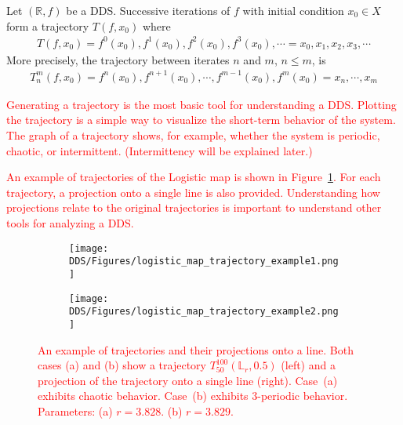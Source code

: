 \begin{definition}[Trajectory]
    Let $\left( \mathbb{R}, f \right)$ be a DDS. Successive iterations of $f$ with initial condition $x_0 \in X$ form a trajectory $T(f, x_0)$ where \begin{eqnarray}
        T(f, x_0) = f^0(x_0), f^1(x_0), f^2(x_0), f^3(x_0), \cdots  = x_0, x_1, x_2, x_3, \cdots
    \end{eqnarray}
    More precisely, the trajectory between iterates $n$ and $m$, $n \leq m$, is
    \begin{eqnarray}
        T_{n}^{m}(f, x_0) = f^{n}(x_0), f^{n+1}(x_0), \cdots, f^{m-1}(x_0), f^{m}(x_0) = x_n, \cdots, x_m
    \end{eqnarray}
\end{definition}

\begin{remark}
    \textcolor{red}{
    Generating a trajectory is the most basic tool for understanding a DDS.
    Plotting the trajectory is a simple way to visualize the short-term behavior of the system.
    The graph of a trajectory shows, for example, whether the system is periodic, chaotic, or intermittent. (Intermittency will be explained later.)
    }
    \par
    \textcolor{red}{
    An example of trajectories of the Logistic map is shown in Figure~\ref{fig:trajectory_example}.
    For each trajectory, a projection onto a single line is also provided.
    Understanding how projections relate to the original trajectories is important to understand other tools for analyzing a DDS.
    }
\end{remark}

\begin{figure}[!h]
    \centering
    \begin{subfigure}{0.6\textwidth}
        \centering
        \texttt{[image: DDS/Figures/logistic\_map\_trajectory\_example1.png]}
        \caption{}
    \end{subfigure}
    \hfill
    \begin{subfigure}{0.6\textwidth}
        \centering
        \texttt{[image: DDS/Figures/logistic\_map\_trajectory\_example2.png]}
        \caption{}
    \end{subfigure}

    \caption{
        \textcolor{red}{ 
        An example of trajectories and their projections onto a line. 
        Both cases (a) and (b) show a trajectory $T_{50}^{100}(\mathbb{L}_{r}, 0.5)$ (left) and a projection of the trajectory onto a single line (right). 
        Case~(a) exhibits chaotic behavior.
        Case~(b) exhibits $3$-periodic behavior.
        Parameters: 
        (a) $r = 3.828$. 
        (b) $r = 3.829$. 
        }
    }
    \label{fig:trajectory_example}
\end{figure}

